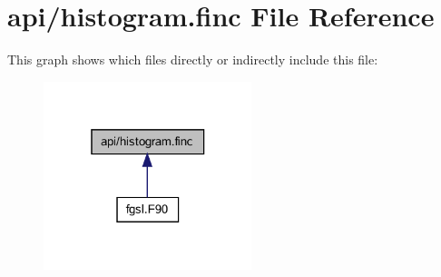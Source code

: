 \hypertarget{histogram_8finc}{}\section{api/histogram.finc File Reference}
\label{histogram_8finc}
This graph shows which files directly or indirectly include this file\+:\nopagebreak
\begin{figure}[H]
\begin{center}
\leavevmode
\includegraphics[width=172pt]{histogram_8finc__dep__incl}
\end{center}
\end{figure}
